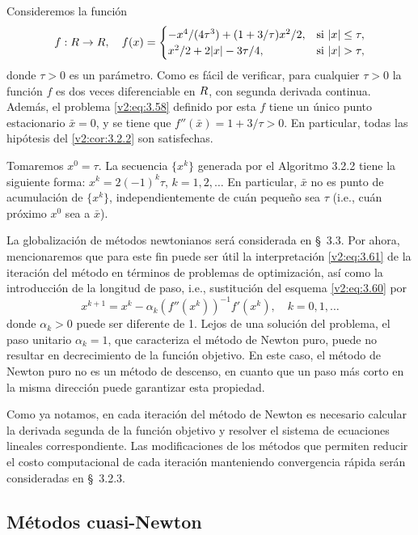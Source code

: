 \begin{example}\label{v2:exa:3.2.1}
    Consideremos la función
    \[
        f : R \to R, \quad f(x) = \begin{cases}
            -x^4 / (4\tau^3) + (1 + 3/\tau)x^2 / 2, & \text{si } |x| \le \tau, \\
            x^2/2 + 2|x| - 3\tau/4, & \text{si } |x| > \tau,
        \end{cases}
    \]
    donde $\tau > 0$ es un parámetro. Como es fácil de verificar, para cualquier $\tau > 0$ la función $f$ es dos veces diferenciable en $R$, con segunda derivada continua. Además, el problema \eqref{v2:eq:3.58} definido por esta $f$ tiene un único punto estacionario $\bar{x} = 0$, y se tiene que $f''(\bar{x}) = 1 + 3/\tau > 0$. En particular, todas las hipótesis del \cref{v2:cor:3.2.2} son satisfechas.
    
    Tomaremos $x^0 = \tau$. La secuencia $\{x^k\}$ generada por el Algoritmo 3.2.2 tiene la siguiente forma: $x^k = 2(-1)^k \tau $, $k=1, 2, \dots$ En particular, $\bar{x}$ no es punto de acumulación de $\{x^k\}$, independientemente de cuán pequeño sea $\tau$ (i.e., cuán próximo $x^0$ sea a $\bar{x}$).
\end{example}

La globalización de métodos newtonianos será considerada en \S~3.3. Por ahora, mencionaremos que para este fin puede ser útil la interpretación \eqref{v2:eq:3.61} de la iteración del método en términos de problemas de optimización, así como la introducción de la longitud de paso, i.e., sustitución del esquema \eqref{v2:eq:3.60} por
\[
    x^{k+1} = x^k - \alpha_k (f''(x^k))^{-1}f'(x^k), \quad k = 0, 1, \dots
\]
donde $\alpha_k > 0$ puede ser diferente de 1. Lejos de una solución del problema, el paso unitario $\alpha_k = 1$, que caracteriza el método de Newton puro, puede no resultar en decrecimiento de la función objetivo. En este caso, el método de Newton puro no es un método de descenso, en cuanto que un paso más corto en la misma dirección puede garantizar esta propiedad.

Como ya notamos, en cada iteración del método de Newton es necesario calcular la derivada segunda de la función objetivo y resolver el sistema de ecuaciones lineales correspondiente. Las modificaciones de los métodos que permiten reducir el costo computacional de cada iteración manteniendo convergencia rápida serán consideradas en \S~3.2.3.

\subsection{Métodos cuasi-Newton}\label{v2:sec:3.2.3}

